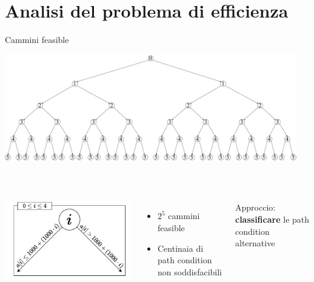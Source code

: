 \documentclass{beamer}
\begin{document}
\section{Analisi del problema di efficienza}
\begin{frame}{Cammini feasible}
    \begin{minipage}[c]{\linewidth}
        \hspace{-10.5mm}
        \includegraphics[width=12.72cm]{img/feasible-paths.pdf}
    \end{minipage}\\
    \vspace{6mm}
    \begin{minipage}[c]{\linewidth}
    \begin{columns}[T] %
        \includegraphics[width=\textwidth]{img/node-feasible.pdf}
        \begin{itemize}
            \item $2^5$ cammini feasible
            \item Centinaia di path condition non soddisfacibili
        \end{itemize}
        \vspace{-2mm}
        \begin{alertblock}{}
            Approccio: \textbf{classificare} le path condition alternative
        \end{alertblock}
    \end{columns}
    \end{minipage}
\end{frame}
\end{document}
